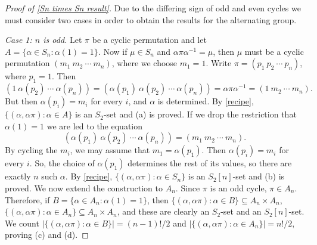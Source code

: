 \documentclass[12pt]{article}
\begin{document}
\begin{proof}[Proof of \autoref{Sn times Sn result}]
    Due to the differing sign of odd and even cycles we must consider two cases in order to obtain the results for the alternating group.
    
    \textit{Case 1: $n$ is odd.} Let $\pi$ be a cyclic permutation and let $A=\{\alpha\in S_n:\alpha(1)=1\}.$ Now if $\mu\in S_n$ and $\alpha\pi\alpha^{-1}=\mu$, then $\mu$ must be a cyclic permutation $(m_1\ m_2\ \cdots\  m_n)$, where we choose $m_1=1$. Write $\pi=(p_1\ p_2\ \cdots\  p_n)$, where $p_1=1$. Then
    $$(1\ \alpha(p_2)\ \cdots\ \alpha(p_n))=(\alpha(p_1)\ \alpha(p_2)\ \cdots\ \alpha(p_n))=\alpha\pi\alpha^{-1}=(1\ m_2\ \cdots\ m_n).$$
    But then $\alpha(p_i)=m_i$ for every $i$, and $\alpha$ is determined. By \autoref{recipe}, $\{(\alpha,\alpha\pi):\alpha\in A\}$ is an $S_2$-set and (a) is proved. If we drop the restriction that $\alpha(1)=1$ we are led to the equation
    $$(\alpha(p_1)\ \alpha(p_2)\ \cdots\ \alpha(p_n))=(m_1\ m_2\ \cdots\ m_n).$$
    By cycling the $m_i$, we may assume that $m_1=\alpha(p_1)$. Then $\alpha(p_i)=m_i$ for every $i$. So, the choice of $\alpha(p_1)$ determines the rest of its values, so there are exactly $n$ such $\alpha$. By \autoref{recipe}, $\{(\alpha,\alpha\pi):\alpha\in S_n\}$ is an $S_2[n]$-set and (b) is proved. We now extend the construction to $A_n$. Since $\pi$ is an odd cycle, $\pi\in A_n$. Therefore, if $B=\{\alpha\in A_n:\alpha(1)=1\}$, then $\{(\alpha,\alpha\pi):\alpha\in B\}\subseteq A_n\times A_n$, $\{(\alpha,\alpha\pi):\alpha\in A_n\}\subseteq A_n\times A_n$, and these are clearly an $S_2$-set and an $S_2[n]$-set. We count $|\{(\alpha,\alpha\pi):\alpha\in B\}|=(n-1)!/2$ and $|\{(\alpha,\alpha\pi):\alpha\in A_n\}|=n!/2$, proving (c) and (d).


\end{proof}
\end{document}
